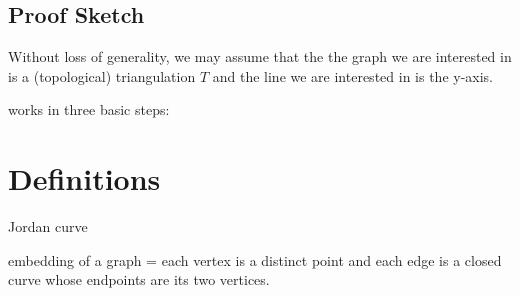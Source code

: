\documentclass{patmorin}
\begin{document}
\subsection{Proof Sketch}


Without loss of generality, we may assume that the the graph we are
interested in is a (topological) triangulation $T$ and the line we are
interested in is the y-axis.

%
%
%


works in three basic steps: 


\section{Definitions}

Jordan curve

embedding of a graph = each vertex is a distinct point and each edge is a closed curve whose endpoints are its two vertices.  
\end{document}
